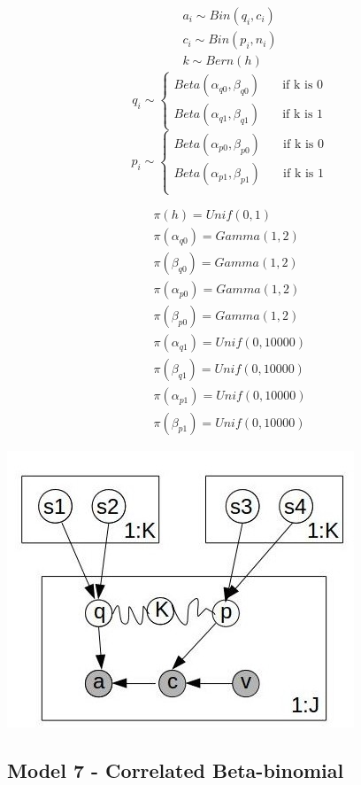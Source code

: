 \documentclass[12pt]{article}
\begin{document}
 \begin{align}
	a_i \sim Bin(q_i,c_i) \\
	c_i \sim Bin(p_i,n_i) \\
	k \sim Bern(h) 
\end{align}
	\[ 
	q_i \sim 
  	\begin{cases}
		Beta(\alpha_{q0},\beta_{q0}) & \quad \text{if k is 0}\\
		Beta(\alpha_{q1},\beta_{q1}) & \quad \text{if k is 1}
	\end{cases}
	\]
	\[
	p_i \sim 
  	\begin{cases}
		Beta(\alpha_{p0},\beta_{p0}) & \quad \text{if k is 0}\\
		Beta(\alpha_{p1},\beta_{p1}) & \quad \text{if k is 1}\\
	\end{cases}
	\]

 \begin{align}
	\pi(h) = Unif(0,1) \\
	\pi(\alpha_{q0}) = Gamma(1,2) \\
	\pi(\beta_{q0}) = Gamma(1,2) \\
	\pi(\alpha_{p0}) = Gamma(1,2) \\
	\pi(\beta_{p0}) = Gamma(1,2) \\
	\pi(\alpha_{q1}) = Unif(0,10000) \\
	\pi(\beta_{q1}) = Unif(0,10000) \\
	\pi(\alpha_{p1}) = Unif(0,10000) \\
	\pi(\beta_{p1}) = Unif(0,10000)
\end{align}

\includegraphics{GraphMod.jpg}

\subsection{Model 7 - Correlated Beta-binomial }
\end{document}
